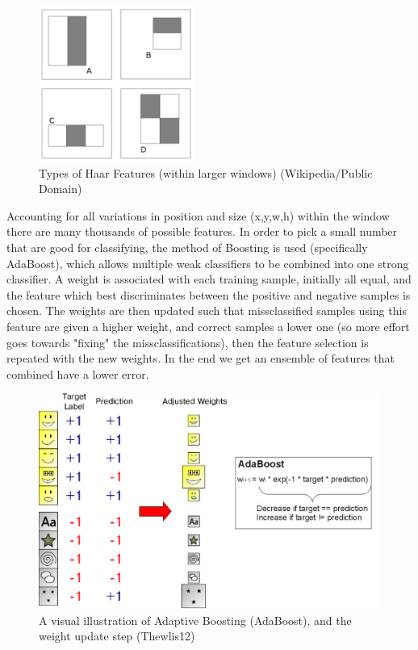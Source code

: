 \documentclass[a4paper]{article}
\begin{document}
\begin{figure}
    \centering
    \includegraphics[width=2.0in]{haar.png}
    \caption{Types of Haar Features (within larger windows) (Wikipedia/Public Domain)}
    \label{haar}
\end{figure}

Accounting for all variations in position and size (x,y,w,h) within the window there are many thousands of possible features. In order to pick a small number that are good for classifying, the method of Boosting is used (specifically AdaBoost), which allows multiple weak classifiers to be combined into one strong classifier. A weight is associated with each training sample, initially all equal, and the feature which best discriminates between the positive and negative samples is chosen. The weights are then updated such that missclassified samples using this feature are given a higher weight, and correct samples a lower one (so more effort goes towards "fixing" the missclassifications), then the feature selection is repeated with the new weights. In the end we get an ensemble of features that combined have a lower error.


\begin{figure}
    \centering
    \includegraphics[width=5.0in]{adaboost.png}
    \caption{A visual illustration of Adaptive Boosting (AdaBoost), and the weight update step (Thewlis12)}
    \label{adaboost}
\end{figure}
\end{document}
